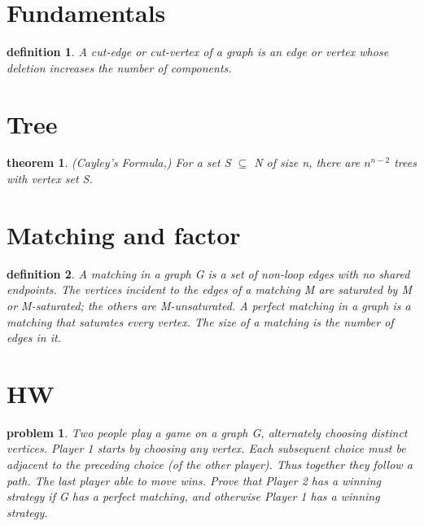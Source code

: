\documentclass[twocolumn]{article}
\title{}
\newtheorem{theorem}{theorem}[section]  %
\newtheorem{definition}{definition}
\newtheorem{problem}{problem}
\begin{document}
\begin{CJK*}{UTF8}{bkai}


\section{Fundamentals}
    \begin{definition}
         A cut-edge or cut-vertex of a graph is an edge or vertex whose deletion
 increases the number of components.
    \end{definition}

\section{Tree}

    \begin{theorem}{(Cayley's Formula,)}
         For a set S $\subseteq$ N of size n, there are $n^{n-2}$ trees with vertex set S.
    \end{theorem}

\section{Matching and factor}
    \begin{definition}
        A matching in a graph G is a set of non-loop edges with no shared endpoints.
 The vertices incident to the edges of a matching M are saturated by M or
 M-saturated; the others are M-unsaturated. A perfect matching in a graph is
 a matching that saturates every vertex. The size of a matching is the number
 of edges in it.
    \end{definition}

\section{HW}

\begin{problem}
 Two people play a game on a graph G, alternately choosing distinct vertices. Player 1 starts by
 choosing any vertex. Each subsequent choice must be adjacent to the preceding choice (of the other
 player). Thus together they follow a path. The last player able to move wins.
 Prove that Player 2 has a winning strategy if G has a perfect matching, and otherwise Player 1 has
 a winning strategy.
\end{problem}


\end{CJK*}
\end{document}
